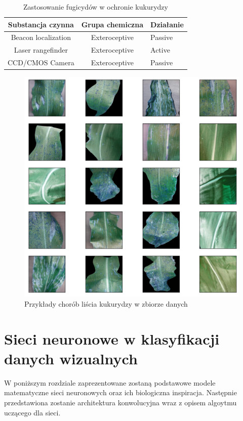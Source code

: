 \documentclass{article}
\begin{document}
\begin{table}[htb] 
	\centering
	\caption{Zastosowanie fugicydów w ochronie kukurydzy}
	\label{tab:fugicydy}
	\begin{tabular}{ccl}
		\hline
		\hline
		Substancja czynna& Grupa chemiczna& Działanie\\
		\hline
		Beacon localization& Exteroceptive& Passive\\
		Laser rangefinder& Exteroceptive& Active\\
		CCD/CMOS Camera& Exteroceptive& Passive\\
		\hline
		\hline
	\end{tabular}
	\newline
\end{table}


\begin{figure}[htb] 
	\label{fig:example_data}
	\centering
	\includegraphics[width=\textwidth]{figures/example_data}
	\caption{Przykłady chorób liścia kukurydzy w zbiorze danych}
\end{figure}

\section{Sieci neuronowe w klasyfikacji danych wizualnych}
W poniższym rozdziale zaprezentowane zostaną podstawowe modele matematyczne sieci neuronowych
oraz ich biologiczna inspiracja. Następnie przedstawiona zostanie architektura konwolucyjna wraz
z opisem algoytmu uczącego dla sieci.
\end{document}
